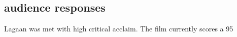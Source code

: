 \documentclass[a4paper]{article}
\begin{document}
\subsection{audience responses}	            
	Lagaan was met with high critical acclaim. The film currently scores a 95%
	     
	    
	

	
	
\end{document}
